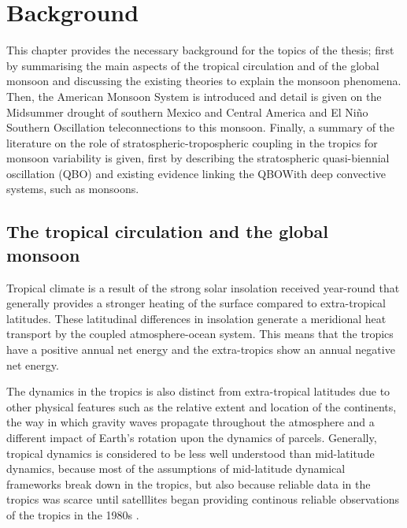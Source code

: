

\chapter{\label{ch:2-litreview}Background}


 This chapter provides the necessary background for the topics of the thesis; first by summarising the main aspects of the tropical circulation and of the global monsoon and discussing the existing theories to explain the monsoon phenomena. Then, the American Monsoon System is introduced and detail is given on the Midsummer drought of southern Mexico and Central America and El Niño Southern Oscillation teleconnections to this monsoon. Finally, a summary of the literature on the role of stratospheric-tropospheric coupling in the tropics for monsoon variability is given, first by describing the stratospheric quasi-biennial oscillation (QBO) and existing evidence linking the QBOWith deep convective systems, such as monsoons. %
\section{The tropical circulation and the global monsoon}\label{sq:bk_tropics}

Tropical climate is a result of the strong solar insolation received year-round that generally provides a stronger heating of the surface compared to extra-tropical latitudes. These latitudinal differences in insolation generate a meridional heat transport by the coupled atmosphere-ocean system. This means that the tropics have a positive annual net energy and the extra-tropics show an annual negative net energy. 

The dynamics in the tropics is also distinct from extra-tropical latitudes due to other physical features such as the relative extent and location of the continents, the way in which gravity waves propagate throughout the atmosphere and a different impact of Earth's rotation upon the dynamics of parcels. 
Generally, tropical dynamics is considered to be less well understood than mid-latitude dynamics, because most of the assumptions of mid-latitude dynamical frameworks break down in the tropics, but also because reliable data in the tropics was scarce until satelllites began providing continous reliable observations of the tropics in the 1980s \citep{emanuel2007quasi,webster2020dynamics}.


